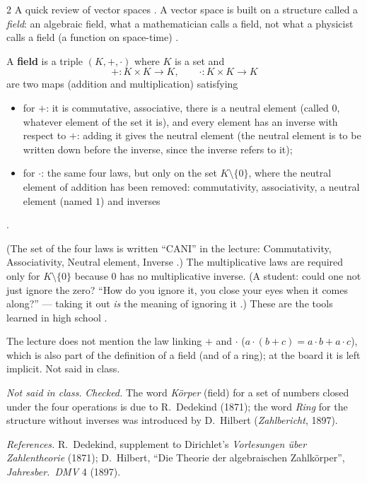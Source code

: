 \begin{paracol}{2}
A quick review of vector spaces . A vector space is built on a structure called a \emph{field}: an algebraic field, what a mathematician calls a field, not what a physicist calls a field (a function on space-time) .

\begin{definition}\label{def:te-field}
A \textbf{field} is a triple $(K,+,\cdot)$ where $K$ is a set and
\[
  +\colon K\times K\to K,\qquad \cdot\colon K\times K\to K
\]
are two maps (addition and multiplication) satisfying
\begin{itemize}
  \item for $+$: it is commutative, associative, there is a neutral element (called $0$, whatever element of the set it is), and every element has an inverse with respect to $+$: adding it gives the neutral element
        (the neutral element is to be written down before the inverse, since the inverse refers to it);
  \item for $\cdot$: the same four laws, but only on the set $K\setminus\{0\}$, where the neutral element of addition has been removed: commutativity, associativity, a neutral element (named $1$) and inverses
\end{itemize}
.
\end{definition}
(The set of the four laws is written ``CANI'' in the lecture: Commutativity, Associativity, Neutral element, Inverse .) The multiplicative laws are required only for $K\setminus\{0\}$ because $0$ has no multiplicative inverse. (A student:
could one not just ignore the zero? ``How do you ignore it, you close your eyes when it comes along?'' --- taking it out \emph{is} the meaning of ignoring it .) These are the tools learned in high school .
\begin{coursenote}
The lecture does not mention the law linking $+$ and $\cdot$ ($a\cdot(b+c)=a\cdot b+a\cdot c$), which is also part of the definition of a field (and of a ring); at the board it is left implicit. Not said in class.
\end{coursenote}
\begin{history}
\emph{Not said in class.} \emph{Checked.} The word \emph{Körper} (field) for a set of numbers closed under the four operations is due to R.~Dedekind (1871); the word \emph{Ring} for the structure without inverses was introduced by D.~Hilbert (\emph{Zahlbericht}, 1897).\par
\emph{References.} R.~Dedekind, supplement to Dirichlet's \emph{Vorlesungen über Zahlentheorie} (1871); D.~Hilbert, ``Die Theorie der algebraischen Zahlkörper'', \emph{Jahresber.\ DMV} 4 (1897).
\end{history}


\end{paracol}
